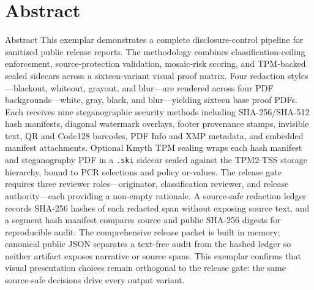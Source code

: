 \documentclass[
  ignorenonframetext,
]{beamer}
\author{\texorpdfstring{}{}}
\date{}
\begin{document}
\section{Abstract}\label{abstract}

\begin{frame}{Abstract}
This exemplar demonstrates a complete disclosure-control pipeline for
sanitized public release reports. The methodology combines
classification-ceiling enforcement, source-protection validation,
mosaic-risk scoring, and TPM-backed sealed sidecars across a
sixteen-variant visual proof matrix. Four redaction styles---blackout,
whiteout, grayout, and blur---are rendered across four PDF
backgrounds---white, gray, black, and blur---yielding sixteen base proof
PDFs. Each receives nine steganographic security methods including
SHA-256/SHA-512 hash manifests, diagonal watermark overlays, footer
provenance stamps, invisible text, QR and Code128 barcodes, PDF Info and
XMP metadata, and embedded manifest attachments. Optional Kmyth TPM
sealing wraps each hash manifest and steganography PDF in a
\texttt{.ski} sidecar sealed against the TPM2-TSS storage hierarchy,
bound to PCR selections and policy or-values. The release gate requires
three reviewer roles---originator, classification reviewer, and release
authority---each providing a non-empty rationale. A source-safe
redaction ledger records SHA-256 hashes of each redacted span without
exposing source text, and a segment hash manifest compares source and
public SHA-256 digests for reproducible audit. The comprehensive release
packet is built in memory; canonical public JSON separates a text-free
audit from the hashed ledger so neither artifact exposes narrative or
source spans. This exemplar confirms that visual presentation choices
remain orthogonal to the release gate: the same source-safe decisions
drive every output variant.
\end{frame}
\end{document}
